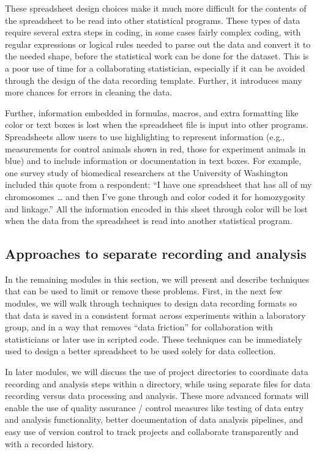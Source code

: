 \documentclass[]{tufte-book}
\begin{document}
These spreadsheet design choices make it much more difficult for the contents of
the spreadsheet to be read into other statistical programs. These types of data
require several extra steps in coding, in some cases fairly complex coding, with
regular expressions or logical rules needed to parse out the data and convert it
to the needed shape, before the statistical work can be done for the dataset.
This is a poor use of time for a collaborating statistician, especially if it
can be avoided through the design of the data recording template. Further, it
introduces many more chances for errors in cleaning the data.

Further, information embedded in formulas, macros, and extra formatting like
color or text boxes is lost when the spreadsheet file is input into other
programs. Spreadsheets allow users to use highlighting to represent information
(e.g., measurements for control animals shown in red, those for experiment
animals in blue) and to include information or documentation in text boxes. For
example, one survey study of biomedical researchers at the University of
Washington included this quote from a respondent: ``I have one spreadsheet that
has all of my chromosomes \ldots{} and then I've gone through and color coded it for
homozygosity and linkage.'' \citep{anderson2007issues} All the information encoded in
this sheet through color will be lost when the data from the spreadsheet is read
into another statistical program.

\subsection{Approaches to separate recording and analysis}\label{approaches-to-separate-recording-and-analysis}

In the remaining modules in this section, we will present and describe
techniques that can be used to limit or remove these problems. First, in the
next few modules, we will walk through techniques to design data recording
formats so that data is saved in a consistent format across experiments within a
laboratory group, and in a way that removes ``data friction'' for collaboration
with statisticians or later use in scripted code. These techniques can be
immediately used to design a better spreadsheet to be used solely for data
collection.

In later modules, we will discuss the use of project directories to coordinate
data recording and analysis steps within a directory, while using separate files
for data recording versus data processing and analysis. These more advanced
formats will enable the use of quality assurance / control measures like testing
of data entry and analysis functionality, better documentation of data analysis
pipelines, and easy use of version control to track projects and collaborate
transparently and with a recorded history.
\end{document}
